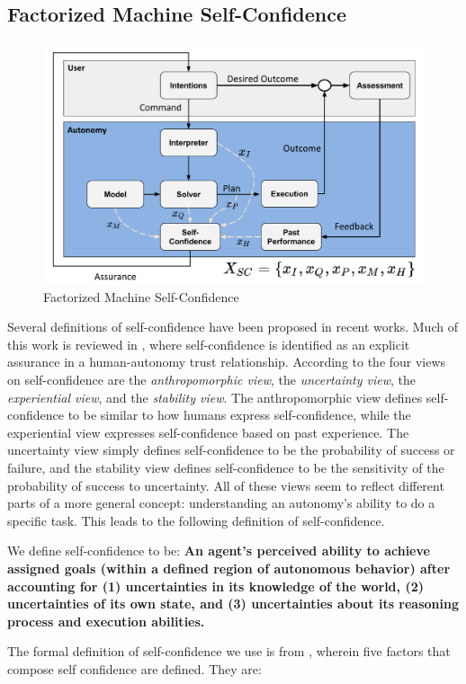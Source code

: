 \subsection{Factorized Machine Self-Confidence}
    \begin{figure}[tbp]
        \centering
        \includegraphics[width=0.65\linewidth]{Figures/SC_flowchart.pdf}
        \caption{Factorized Machine Self-Confidence}
        \label{fig:famsec}
    \end{figure}

    Several definitions of self-confidence have been proposed in recent works. Much of this work is reviewed in \cite{Israelsen2017-ym}, where self-confidence is identified as an explicit assurance in a human-autonomy trust relationship. According to \cite{Sweet2016-tz} the four views on self-confidence are the \textit{anthropomorphic view}, the \textit{uncertainty view}, the \textit{experiential view}, and the \textit{stability view}. The anthropomorphic view defines self-confidence to be similar to how humans express self-confidence, while the experiential view expresses self-confidence based on past experience. The uncertainty view simply defines self-confidence to be the probability of success or failure, and the stability view defines self-confidence to be the sensitivity of the probability of success to uncertainty. All of these views seem to reflect different parts of a more general concept: understanding an autonomy's ability to do a specific task. This leads to the following definition of self-confidence.

    We define self-confidence to be: \textbf{An agent's perceived ability to achieve assigned goals (within a defined region of autonomous behavior) after accounting for (1) uncertainties in its knowledge of the world, (2) uncertainties of its own state, and (3) uncertainties about its reasoning process and execution abilities.}

    The formal definition of self-confidence we use is from \cite{Aitken2016-cv}, wherein five factors that compose self confidence are defined. They are: 

